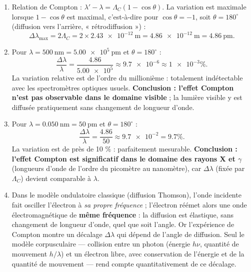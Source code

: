 \documentclass[11pt]{article}
\providecommand{\degree}{^{\circ}}
\begin{document}
\begin{corrige}
\begin{enumerate}
\item Relation de Compton : $\lambda' - \lambda = \Lambda_C(1-\cos\theta)$. La variation est maximale lorsque $1-\cos\theta$ est maximal, c'est-à-dire pour $\cos\theta = -1$, soit $\theta = 180\degree$ (diffusion vers l'arrière, « rétrodiffusion ») :
\[ \Delta\lambda_{\max} = 2\Lambda_C = 2\times\SI{2,43e-12}{\meter} = \SI{4,86e-12}{\meter} = \SI{4,86}{\pico\meter}. \]
\item Pour $\lambda = \SI{500}{\nano\meter} = \num{5,00e5}~\text{pm}$ et $\theta = 180\degree$ :
\[ \frac{\Delta\lambda}{\lambda} = \frac{\num{4,86}}{\num{5,00e5}} \approx \num{9,7e-6} \approx \num{1e-3}\%. \]
La variation relative est de l'ordre du millionième : totalement indétectable avec les spectromètres optiques usuels. \textbf{Conclusion : l'effet Compton n'est pas observable dans le domaine visible} ; la lumière visible y est diffusée pratiquement sans changement de longueur d'onde.
\item Pour $\lambda = \SI{0,050}{\nano\meter} = \num{50}~\text{pm}$ et $\theta = 180\degree$ :
\[ \frac{\Delta\lambda}{\lambda} = \frac{\num{4,86}}{\num{50}} \approx \num{9,7e-2} = \num{9,7}\%. \]
La variation est de près de 10 \% : parfaitement mesurable. \textbf{Conclusion : l'effet Compton est significatif dans le domaine des rayons X et $\gamma$} (longueurs d'onde de l'ordre du picomètre au nanomètre), car $\Delta\lambda$ (fixée par $\Lambda_C$) devient comparable à $\lambda$.
\item Dans le modèle ondulatoire classique (diffusion Thomson), l'onde incidente fait osciller l'électron à \emph{sa propre fréquence} ; l'électron réémet alors une onde électromagnétique de \textbf{même fréquence} : la diffusion est élastique, sans changement de longueur d'onde, quel que soit l'angle. Or l'expérience de Compton montre un décalage $\Delta\lambda$ qui dépend de l'angle de diffusion. Seul le modèle corpusculaire — collision entre un photon (énergie $h\nu$, quantité de mouvement $h/\lambda$) et un électron libre, avec conservation de l'énergie et de la quantité de mouvement — rend compte quantitativement de ce décalage.
\end{enumerate}
\end{corrige}
\end{document}
